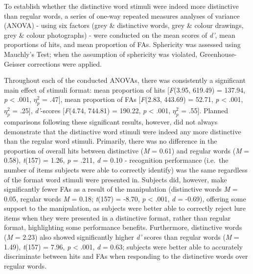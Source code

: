 \documentclass[
  11pt,
]{article}
\begin{document}
To establish whether the distinctive word stimuli were indeed more
distinctive than regular words, a series of one-way repeated measures
analyses of variance (ANOVA) - using six factors (grey \& distinctive
words, grey \& colour drawings, grey \& colour photographs) - were
conducted on the mean scores of \emph{d'}, mean proportions of hits, and
mean proportion of FAs. Sphericity was assessed using Mauchly's Test;
when the assumption of sphericity was violated, Greenhouse-Geisser
corrections were applied.

Throughout each of the conducted ANOVAs, there was consistently a
significant main effect of stimuli format: mean proportion of hits
{[}\emph{F}(3.95, 619.49) = 137.94, \emph{p} \textless{} .001,
\(\eta^2_p\) = .47{]}, mean proportion of FAs {[}\emph{F}(2.83, 443.69)
= 52.71, \emph{p} \textless{} .001, \(\eta^2_p\) = .25{]},
\emph{d'}-scores {[}\emph{F}(4.74, 744.81) = 190.22, \emph{p}
\textless{} .001, \(\eta^2_p\) = .55{]}. Planned comparisons following
these significant results, however, did not always demonstrate that the
distinctive word stimuli were indeed any more distinctive than the
regular word stimuli. Primarily, there was no difference in the
proportion of overall hits between distinctive (\emph{M} = 0.61) and
regular words (\emph{M} = 0.58), \emph{t}(157) = 1.26, \emph{p} = .211,
\emph{d} = 0.10 - recognition performance (i.e.~the number of items
subjects were able to correctly identify) was the same regardless of the
format word stimuli were presented in. Subjects did, however, make
significantly fewer FAs as a result of the manipulation (distinctive
words \emph{M} = 0.05, regular words \emph{M} = 0.18; \emph{t}(157) =
-8.70, \emph{p} \textless{} .001, \emph{d} = -0.69), offering some
support to the manipulation, as subjects were better able to correctly
reject lure items when they were presented in a distinctive format,
rather than regular format, highlighting some performance benefits.
Furthermore, distinctive words (\emph{M} = 2.23) also showed
significantly higher \emph{d'} scores than regular words (\emph{M} =
1.49), \emph{t}(157) = 7.96, \emph{p} \textless{} .001, \emph{d} = 0.63;
subjects were better able to accurately discriminate between hits and
FAs when responding to the distinctive words over regular words.
\end{document}
